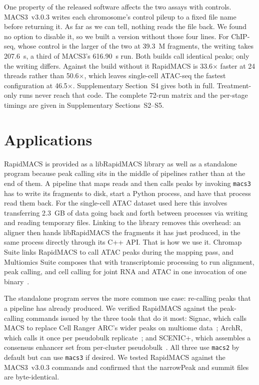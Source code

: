 \documentclass[namedate,webpdf,contemporary,large]{oup-authoring-template}
\begin{document}
One property of the released software affects the two assays with controls. MACS3~v3.0.3 writes each chromosome's control pileup to a fixed file name before returning it. As far as we can tell, nothing reads the file back. We found no option to disable it, so we built a version without those four lines. For ChIP-seq, whose control is the larger of the two at 39.3~M fragments, the writing takes 207.6~s, a third of MACS3's 616.90~s run. Both builds call identical peaks; only the writing differs. Against the build without it RapidMACS is 33.6$\times$ faster at 24 threads rather than 50.6$\times$, which leaves single-cell ATAC-seq the fastest configuration at 46.5$\times$. Supplementary Section~S4 gives both in full. Treatment-only runs never reach that code. The complete 72-run matrix and the per-stage timings are given in Supplementary Sections~S2--S5.

\section{Applications}
RapidMACS is provided as a libRapidMACS library as well as a standalone program because peak calling sits in the middle of pipelines rather than at the end of them. A pipeline that maps reads and then calls peaks by invoking \texttt{macs3} has to write its fragments to disk, start a Python process, and have that process read them back. For the single-cell ATAC dataset used here this involves transferring 2.3~GB of data going back and forth between processes via writing and reading temporary files. Linking to the library removes this overhead: an aligner then hands libRapidMACS the fragments it has just produced, in the same process directly through its C++ API. That is how we use it. Chromap Suite links RapidMACS to call ATAC peaks during the mapping pass, and Multiomics Suite composes that with transcriptomic processing to run alignment, peak calling, and cell calling for joint RNA and ATAC in one invocation of one binary~\citep{multiomicssuite}.

The standalone program serves the more common use case: re-calling peaks that a pipeline has already produced. We verified RapidMACS against the peak-calling commands issued by the three tools that do it most: Signac, which calls MACS to replace Cell Ranger ARC's wider peaks on multiome data~\citep{signac}; ArchR, which calls it once per pseudobulk replicate~\citep{archr}; and SCENIC+, which assembles a consensus enhancer set from per-cluster pseudobulk~\citep{scenicplus}. All three use \texttt{macs2} by default but can use \texttt{macs3} if desired. We tested RapidMACS against the MACS3~v3.0.3 commands and confirmed that the narrowPeak and summit files are byte-identical.
\end{document}
